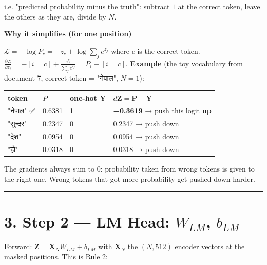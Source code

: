 \documentclass[11pt,a4paper,oneside]{report}
\begin{document}
i.e. "predicted probability minus the truth": subtract \(1\) at the correct token, leave the others as they are, divide by \(N\).

\textbf{Why it simplifies (for one position)}

\(\mathcal{L} = -\log P_c = -z_c + \log\sum_j e^{z_j}\) where \(c\) is the correct token.
\(\frac{\partial \mathcal{L}}{\partial z_i} = -[i = c] + \frac{e^{z_i}}{\sum_j e^{z_j}} = P_i - [i = c]\).
\textbf{Example} (the toy vocabulary from document 7, correct token = "नेपाल", \(N = 1\)):

{\def\LTcaptype{none} %
\begin{longtable}[]{@{}llll@{}}
\toprule\noalign{}
token & \(P\) & one-hot \(\mathbf{Y}\) & \(d\mathbf{Z} = \mathbf{P} - \mathbf{Y}\) \\
\midrule\noalign{}
\endhead
\bottomrule\noalign{}
\endlastfoot
"नेपाल" ✅ & 0.6381 & 1 & \textbf{−0.3619} → push this logit \textbf{up} \\
"सुन्दर" & 0.2347 & 0 & 0.2347 → push down \\
"देश" & 0.0954 & 0 & 0.0954 → push down \\
"हो" & 0.0318 & 0 & 0.0318 → push down \\
\end{longtable}
}

The gradients always sum to \(0\): probability taken from wrong tokens is given to the right one. Wrong tokens that got more probability get pushed down harder.

\begin{center}\rule{0.5\linewidth}{0.5pt}\end{center}

\section{\texorpdfstring{3. Step 2 --- LM Head: \(W_{LM}\), \(b_{LM}\)}{3. Step 2 --- LM Head: W\_\{LM\}, b\_\{LM\}}}\label{3-step-2--lm-head-w_lm-b_lm}

Forward: \(\mathbf{Z} = \mathbf{X}_N W_{LM} + b_{LM}\) with \(\mathbf{X}_N\) the \((N, 512)\) encoder vectors at the masked positions. This is Rule 2:

\begin{center}\end{center}
\end{document}
